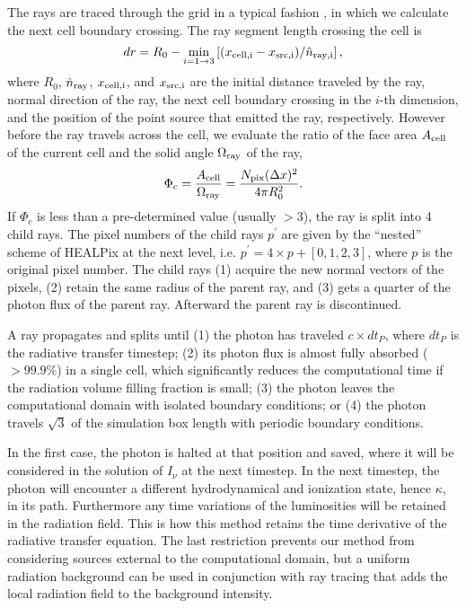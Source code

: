 The rays are traced through the grid in a typical fashion
\citep[e.g.][]{Abel99_RT}, in which we calculate the next cell
boundary crossing.  The ray segment length crossing the cell is
%
\begin{equation}
  \label{eqn:trace}
  dr = R_0 - \min_{i=1 \rightarrow 3} \left[(x_{\rm cell,i} - x_{\rm src,i}) /
    \hat{n}_{\rm ray,i} \right],
\end{equation}
%
where $R_0$, $\hat{n}_{\rm ray}$, $x_{\rm cell,i}$, and $x_{\rm
  src,i}$ are the initial distance traveled by the ray, normal
direction of the ray, the next cell boundary crossing in the $i$-th
dimension, and the position of the point source that emitted the ray,
respectively.  However before the ray travels across the cell, we
evaluate the ratio of the face area $A_{\rm cell}$ of the current cell
and the solid angle $\Omega_{\rm ray}$ of the ray,
%
\begin{equation}
  \label{eqn:split}
  \Phi_c = \frac{A_{\rm cell}} {\Omega_{\rm ray}} = 
  \frac{N_{\rm pix} (\Delta x)^2} {4\pi R_0^2}.
\end{equation}
%
If $\Phi_c$ is less than a pre-determined value (usually $>3$), the
ray is split into 4 child rays.  The pixel numbers of the child rays
$p^\prime$ are given by the ``nested'' scheme of HEALPix at the next
level, i.e. $p^\prime = 4 \times p + [0,1,2,3]$, where $p$ is the
original pixel number.  The child rays (1) acquire the new normal
vectors of the pixels, (2) retain the same radius of the parent ray,
and (3) gets a quarter of the photon flux of the parent ray.
Afterward the parent ray is discontinued.

A ray propagates and splits until (1) the photon has traveled $c
\times dt_P$, where $dt_P$ is the radiative transfer timestep; (2) its
photon flux is almost fully absorbed ($>99.9\%$) in a single cell,
which significantly reduces the computational time if the radiation
volume filling fraction is small; (3) the photon leaves the
computational domain with isolated boundary conditions; or (4) the
photon travels $\sqrt{3}$ of the simulation box length with periodic
boundary conditions.

In the first case, the photon is halted at that position and saved,
where it will be considered in the solution of $I_\nu$ at the next
timestep.  In the next timestep, the photon will encounter a different
hydrodynamical and ionization state, hence $\kappa$, in its path.
Furthermore any time variations of the luminosities will be retained
in the radiation field.  This is how this method retains the time
derivative of the radiative transfer equation.  The last restriction
prevents our method from considering sources external to the
computational domain, but a uniform radiation background can be used
in conjunction with ray tracing that adds the local radiation field to
the background intensity.

